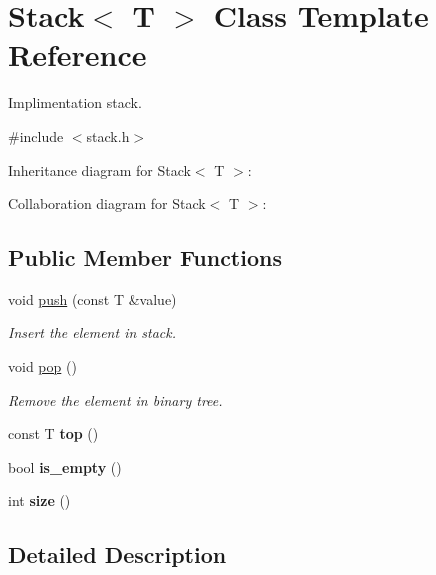 \hypertarget{classStack}{}\section{Stack$<$ T $>$ Class Template Reference}
\label{classStack}


Implimentation stack.  




{\ttfamily \#include $<$stack.\+h$>$}



Inheritance diagram for Stack$<$ T $>$\+:


Collaboration diagram for Stack$<$ T $>$\+:
\subsection*{Public Member Functions}
\begin{DoxyCompactItemize}
\item 
void \hyperlink{classStack_a7b0f0506fd1cd7ec5756bb2b51ff908d}{push} (const T \&value)
\begin{DoxyCompactList}\small\item\em Insert the element in stack. \end{DoxyCompactList}\item 
\mbox{\label{classStack_a2723aec5c7e2611b97fcffeb7709de33}} 
void \hyperlink{classStack_a2723aec5c7e2611b97fcffeb7709de33}{pop} ()
\begin{DoxyCompactList}\small\item\em Remove the element in binary tree. \end{DoxyCompactList}\item 
\mbox{\label{classStack_a220040eabeb4b911d0f278648f768c18}} 
const T {\bfseries top} ()
\item 
\mbox{\label{classStack_ae667e7ba22b4abd3158996ec17a712a4}} 
bool {\bfseries is\+\_\+empty} ()
\item 
\mbox{\label{classStack_a3091d98f798b1b3e69b644d5b778c428}} 
int {\bfseries size} ()
\end{DoxyCompactItemize}


\subsection{Detailed Description}
